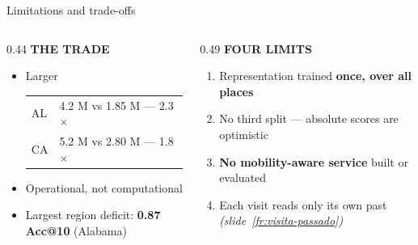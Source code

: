 \documentclass{beamer}
\begin{document}
\begin{frame}{Limitations and trade-offs}
    \vspace{0pt}%
    \small
    \begin{columns}[T,onlytextwidth]
        \begin{column}{0.44\textwidth}
            \textbf{\color{primaryshade}THE TRADE}\par\medskip
            \begin{itemize}\setlength{\itemsep}{2ex}
                \item Larger
                      \par\smallskip
                      \begin{tabular}{@{}l@{\ \ }l@{}}
                          AL & 4.2 M vs 1.85 M --- 2.3$\times$\\
                          CA & 5.2 M vs 2.80 M --- 1.8$\times$
                      \end{tabular}
                \item \alert{Operational, not computational}
                \item Largest region deficit: \textbf{0.87 Acc@10} (Alabama)
            \end{itemize}
        \end{column}
        \hfill
        \begin{column}{0.49\textwidth}
            \textbf{\color{alertshade}FOUR LIMITS}\par\medskip
            \begin{enumerate}\setlength{\itemsep}{2ex}
                \item Representation trained \textbf{once, over all places}
                \item \alert{No third split} --- absolute scores are optimistic
                \item \textbf{No mobility-aware service} built or evaluated
                \item Each visit reads only its own past
                      \emph{(slide~\ref{fr:visita-passado})}
            \end{enumerate}
        \end{column}
    \end{columns}
\end{frame}
\end{document}
